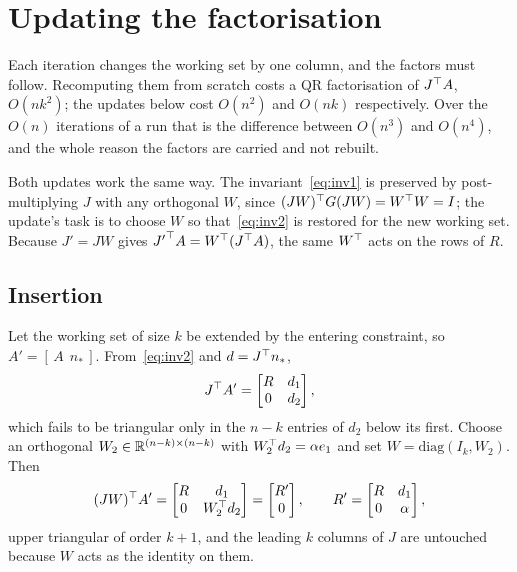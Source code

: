 \section{Updating the factorisation}
\label{sec:updates}

Each iteration changes the working set by one column, and the factors must follow.
Recomputing them from scratch costs a QR factorisation of $J^{\top} A$, $O(nk^2)$; the
updates below cost $O(n^2)$ and $O(nk)$ respectively. Over the $O(n)$ iterations
of a run that is the difference between $O(n^3)$ and $O(n^4)$, and the whole reason
the factors are carried and not rebuilt.

Both updates work the same way. The invariant~\eqref{eq:inv1} is preserved by
post-multiplying $J$ with any orthogonal $W$, since $(JW)^{\top} G (JW) = W^{\top} W = I$;
the update's task is to choose $W$ so that~\eqref{eq:inv2} is restored for the new
working set. Because $J' = JW$ gives ${J'}^{\top} A = W^{\top}(J^{\top} A)$, the same $W^{\top}$ acts on
the rows of $R$.

\subsection{Insertion}
\label{ssec:insert}

Let the working set of size $k$ be extended by the entering constraint, so
$A' = [\,A \ \ n_*\,]$. From~\eqref{eq:inv2} and $d = J^{\top} n_*$,
\begin{equation}
  J^{\top} A' = \begin{bmatrix} R & d_1 \\ 0 & d_2 \end{bmatrix},
  \label{eq:insert1}
\end{equation}
which fails to be triangular only in the $n-k$ entries of $d_2$ below its first.
Choose an orthogonal $W_2 \in \mathbb{R}^{(n-k)\times(n-k)}$ with
$W_2^{\top} d_2 = \alpha e_1$ and set $W = \mathrm{diag}(I_k, W_2)$. Then
\begin{equation}
  (JW)^{\top} A' = \begin{bmatrix} R & d_1 \\ 0 & W_2^{\top} d_2\end{bmatrix}
  = \begin{bmatrix} R' \\ 0 \end{bmatrix},
  \qquad
  R' = \begin{bmatrix} R & d_1 \\ 0 & \alpha \end{bmatrix},
  \label{eq:insert2}
\end{equation}
upper triangular of order $k+1$, and the leading $k$ columns of $J$ are untouched
because $W$ acts as the identity on them.

